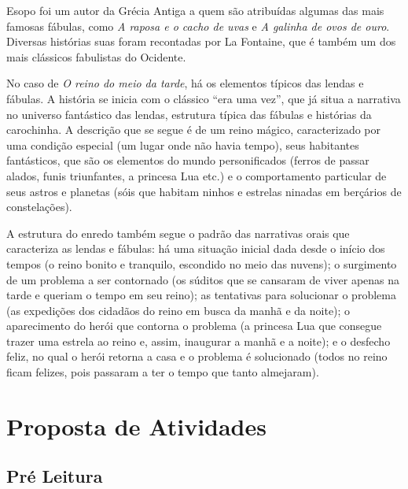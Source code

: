\documentclass[11pt]{extarticle}
\begin{document}
Esopo foi um autor da Grécia Antiga a quem são atribuídas algumas das mais famosas fábulas, como \textit{A raposa e o cacho de uvas} e \textit{A galinha de ovos de ouro}. Diversas  histórias suas foram recontadas por La Fontaine, que é também um dos mais clássicos fabulistas do Ocidente.

No caso de \textit{O reino do meio da tarde}, há os elementos típicos das lendas e fábulas.
A história se inicia com o clássico ``era uma vez'', que já situa a narrativa no universo fantástico das lendas, estrutura típica das fábulas e histórias da carochinha. A descrição que se segue é de um reino mágico, caracterizado por uma condição especial (um lugar onde não havia tempo), seus habitantes fantásticos, que são os elementos do mundo personificados (ferros de passar alados, funis triunfantes, a princesa Lua etc.) e o comportamento particular de seus astros e planetas (sóis que habitam ninhos e estrelas ninadas em berçários de constelações).

A estrutura do enredo também segue o padrão das narrativas orais que caracteriza as lendas e fábulas: há uma situação inicial dada desde o início dos tempos (o reino bonito e tranquilo, escondido no meio das nuvens); o surgimento de um problema a ser contornado (os súditos que se cansaram de viver apenas na tarde e queriam o tempo em seu reino); as tentativas para solucionar o problema (as expedições dos cidadãos do reino em busca da manhã e da noite); o aparecimento do herói que contorna o problema (a princesa Lua que consegue trazer uma estrela ao reino e, assim, inaugurar a manhã e a noite); e o desfecho feliz, no qual o herói retorna a casa e o problema é solucionado (todos no reino ficam felizes, pois passaram a ter o tempo que tanto almejaram).

\section{Proposta de Atividades}
\subsection{Pré Leitura}
\end{document}
